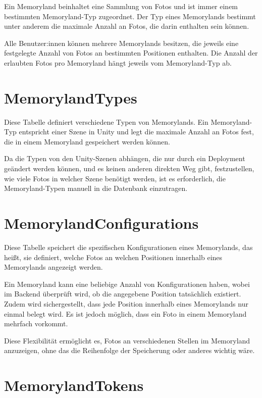 Ein Memoryland beinhaltet eine Sammlung von Fotos und ist immer einem bestimmten 
Memoryland-Typ zugeordnet. Der Typ eines Memorylands bestimmt unter anderem die maximale 
Anzahl an Fotos, die darin enthalten sein können.

Alle Benutzer:innen können mehrere Memorylands besitzen, die jeweils eine festgelegte Anzahl 
von Fotos an bestimmten Positionen enthalten. Die Anzahl der erlaubten Fotos pro Memoryland
hängt jeweils vom Memoryland-Typ ab.

\section{MemorylandTypes}

Diese Tabelle definiert verschiedene Typen von Memorylands. Ein Memoryland-Typ 
entspricht einer Szene in Unity und legt die maximale Anzahl an Fotos fest, die in 
einem Memoryland gespeichert werden können.

Da die Typen von den Unity-Szenen abhängen, die nur durch ein Deployment geändert werden 
können, und es keinen anderen direkten Weg gibt, festzustellen, wie viele Fotos in welcher 
Szene benötigt werden, ist es erforderlich, die Memoryland-Typen manuell in die Datenbank 
einzutragen.

\section{MemorylandConfigurations}
\label{sec:memoryland-config}

Diese Tabelle speichert die spezifischen Konfigurationen eines Memorylands, das heißt, 
sie definiert, welche Fotos an welchen Positionen innerhalb eines Memorylands angezeigt werden. 

Ein Memoryland kann eine beliebige Anzahl von Konfigurationen haben, wobei im Backend überprüft 
wird, ob die angegebene Position tatsächlich existiert. Zudem wird sichergestellt, dass jede 
Position innerhalb eines Memorylands nur einmal belegt wird. Es ist jedoch möglich, dass ein 
Foto in einem Memoryland mehrfach vorkommt. 

Diese Flexibilität ermöglicht es, Fotos an verschiedenen Stellen im Memoryland anzuzeigen,
ohne das die Reihenfolge der Speicherung oder anderes wichtig wäre.

\section{MemorylandTokens}

